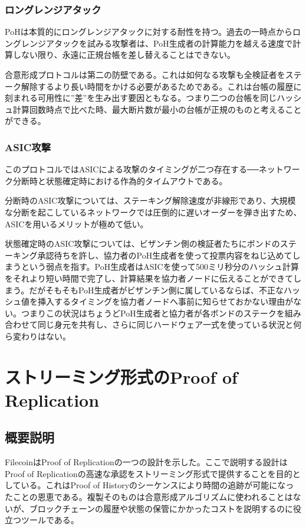 \documentclass[12pt]{ltjsarticle}
\begin{document}
\subsubsection{ロングレンジアタック}
PoHは本質的にロングレンジアタックに対する耐性を持つ。過去の一時点からロングレンジアタックを試みる攻撃者は、PoH生成者の計算能力を越える速度で計算しない限り、永遠に正規台帳を差し替えることはできない。

合意形成プロトコルは第二の防壁である。これは如何なる攻撃も全検証者をステーク解除するより長い時間をかける必要があるためである。これは台帳の履歴に刻まれる可用性に”差”を生み出す要因ともなる。つまり二つの台帳を同じハッシュ計算回数時点で比べた時、最大断片数が最小の台帳が正規のものと考えることができる。

\subsubsection{ASIC攻撃}

このプロトコルではASICによる攻撃のタイミングが二つ存在する──ネットワーク分断時と状態確定時における作為的タイムアウトである。

分断時のASIC攻撃については、ステーキング解除速度が非線形であり、大規模な分断を起こしているネットワークでは圧倒的に遅いオーダーを弾き出すため、ASICを用いるメリットが極めて低い。

状態確定時のASIC攻撃については、ビザンチン側の検証者たちにボンドのステーキング承認待ちを許し、協力者のPoH生成者を使って投票内容をねじ込めてしまうという弱点を指す。PoH生成者はASICを使って500ミリ秒分のハッシュ計算をそれより短い時間で完了し、計算結果を協力者ノードに伝えることができてしまう。だがそもそもPoH生成者がビザンチン側に属しているならば、不正なハッシュ値を挿入するタイミングを協力者ノードへ事前に知らせておかない理由がない。つまりこの状況はちょうどPoH生成者と協力者が各ボンドのステークを組み合わせて同じ身元を共有し、さらに同じハードウェア一式を使っている状況と何ら変わりはない。

\section{ストリーミング形式のProof of Replication}\label{porep}
\subsection{概要説明}
FilecoinはProof of Replicationの一つの設計を示した\cite{filecoinporep}。ここで説明する設計はProof of Replicationの高速な承認をストリーミング形式で提供することを目的としている。これはProof of Historyのシーケンスにより時間の追跡が可能になったことの恩恵である。複製そのものは合意形成アルゴリズムに使われることはないが、ブロックチェーンの履歴や状態の保管にかかったコストを説明するのに役立つツールである。
\end{document}
